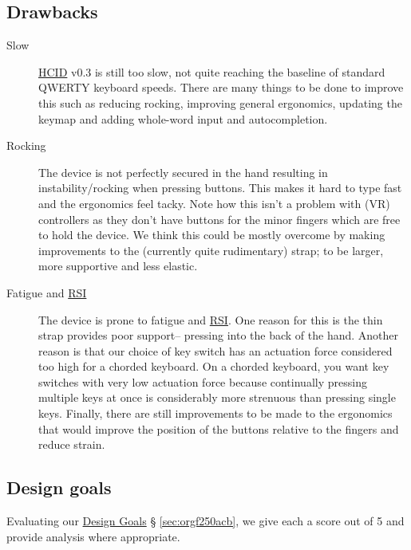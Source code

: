 \documentclass[logo,bsc,singlespacing,parskip]{infthesis}
\begin{document}
\subsection{Drawbacks}
\label{sec:org52342a1}
\begin{description}
\item[{Slow}] \hyperref[org0c83164]{HCID} v0.3 is still too slow, not quite reaching the baseline of standard QWERTY keyboard speeds.
There are many things to be done to improve this such as reducing rocking, improving general ergonomics, updating the keymap and adding whole-word input and autocompletion.

\item[{Rocking}] The device is not perfectly secured in the hand resulting in instability/rocking when pressing buttons.
This makes it hard to type fast and the ergonomics feel tacky.
Note how this isn't a problem with (VR) controllers as they don't have buttons for the minor fingers which are free to hold the device.
We think this could be mostly overcome by making improvements to the (currently quite rudimentary) strap; to be larger, more supportive and less elastic.

\item[{Fatigue and \hyperref[org77f0234]{RSI}}] The device is prone to fatigue and \hyperref[org77f0234]{RSI}.
One reason for this is the thin strap provides poor support-- pressing into the back of the hand.
Another reason is that our choice of key switch has an actuation force considered too high for a chorded keyboard.
On a chorded keyboard, you want key switches with very low actuation force because continually pressing multiple keys at once is considerably more strenuous than pressing single keys.
Finally, there are still improvements to be made to the ergonomics that would improve the position of the buttons relative to the fingers and reduce strain.
\end{description}
\subsection{Design goals}
\label{sec:org3c83bbc}
Evaluating our \hyperref[sec:orgf250acb]{Design Goals} § \ref{sec:orgf250acb}, we give each a score out of 5 and provide analysis where appropriate. \smallskip
\end{document}
